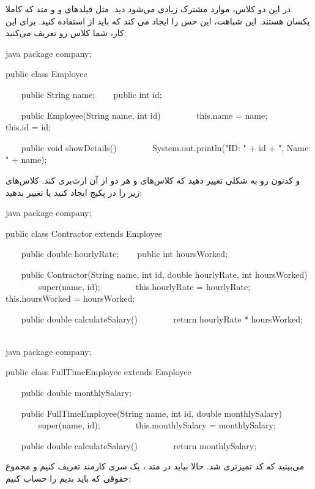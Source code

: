 در این دو کلاس، موارد مشترک زیادی می‌شود دید. مثل فیلدهای
 و  و متد  که
کاملا یکسان هستند. این شباهت، این حس را ایجاد می کند که باید از
 استفاده کنید. برای این کار، شما کلاس
 رو تعریف می‌کنید:

\begin{codebox}{java}
package company;

public class Employee {
    public String name;
    public int id;

    public Employee(String name, int id) {
        this.name = name;
        this.id = id;  
    }

    public void showDetails() {  
        System.out.println("ID: " + id + ", Name: " + name);  
    }  
}
\end{codebox}

و کدتون رو به شکلی تغییر دهید که کلاس‌های 
و  هر دو از آن ارث‌بری کند. کلاس‌های زیر را در
پکیج  ایجاد کنید یا تغییر بدهید:

\begin{codebox}{java}
package company;

public class Contractor extends Employee {
    public double hourlyRate;
    public int hoursWorked;

    public Contractor(String name, int id, double hourlyRate, int hoursWorked) {
        super(name, id);
        this.hourlyRate = hourlyRate;
        this.hoursWorked = hoursWorked;  
    }

    public double calculateSalary() {
        return hourlyRate * hoursWorked;  
    }  
}
\end{codebox}

\begin{codebox}{java}
package company;

public class FullTimeEmployee extends Employee {
    public double monthlySalary;

    public FullTimeEmployee(String name, int id, double monthlySalary) {
        super(name, id);
        this.monthlySalary = monthlySalary;  
    }

    public double calculateSalary() {
        return monthlySalary;  
    }  
}
\end{codebox}

می‌بینید که کد تمیزتری شد. حالا بیاید در متد  ، یک سری
کارمند تعریف کنیم و مجموع حقوقی که باید بدیم را حساب کنیم:

